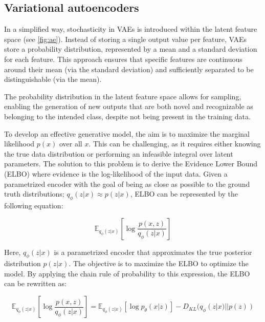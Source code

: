 \subsection{Variational autoencoders}

In a simplified way, stochasticity in VAEs is introduced within the latent feature space (see \autoref{fig:ae}). Instead of storing a single output value per feature, VAEs store a probability distribution, represented by a mean and a standard deviation for each feature. This approach ensures that specific features are continuous around their mean (via the standard deviation) and sufficiently separated to be distinguishable (via the mean).

The probability distribution in the latent feature space allows for sampling, enabling the generation of new outputs that are both novel and recognizable as belonging to the intended class, despite not being present in the training data.

To develop an effective generative model, the aim is to maximize the marginal likelihood $p(x)$ over all $x$. This can be challenging, as it requires either knowing the true data distribution or performing an infeasible integral over latent parameters. The solution to this problem is to derive the Evidence Lower Bound (ELBO) where evidence is the log-likelihood of the input data. Given a parametrized encoder with the goal of being as close as possible to the ground truth distributions; $q_\phi(z|x)\approx p(z|x)$, ELBO can be represented by the following equation:

\begin{equation}\label{eqn:elbo}
 \mathbb{E}_{q_\phi(z|x)}\left[\log \frac{p(x,z)}{q_\phi(z|x)}  \right]
\end{equation}


Here, $q_\phi(z|x)$ is a parametrized encoder that approximates the true posterior distribution $p(z|x)$. The objective is to maximize the ELBO to optimize the model. By applying the chain rule of probability to this expression, the ELBO can be rewritten as:

\begin{equation}\label{eqn:loss}
 \mathbb{E}_{q_\phi(z|x)}\left[\log \frac{p(x,z)}{q_\phi(z|x)}  \right]
 = \mathbb{E}_{q_\phi(z|x)}[\log p_\theta (x|z)] -D_{KL}(q_\phi(z|x)||p(z))
\end{equation}

